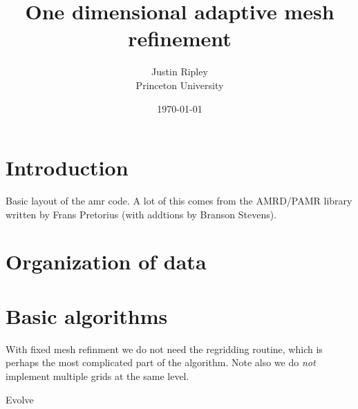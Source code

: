 \documentclass[10pt,letter]{article}
\begin{document}
\title{One dimensional adaptive mesh refinement}    
\author{Justin Ripley
	\\Princeton University}
\date{\today}
 
\maketitle 
     
\section{Introduction}
       Basic layout of the amr code. A lot of this comes from the AMRD/PAMR
library written by Frans Pretorius (with addtions by Branson Stevens).  

\section{Organization of data}

\section{Basic algorithms}

	With fixed mesh refinment we do not need the regridding routine,
which is perhaps the most complicated part of the algorithm. Note also
we do \emph{not} implement multiple grids at the same level.

\begin{algorithm}
\caption{Evolve}\label{alg:time_step}
\begin{algorithmic}[1]
			\State{}
		\EndIf 
		\EndIf
		\EndIf
	\EndFor
	\EndIf
\EndProcedure
\end{algorithmic}
\end{algorithm}
\end{document}
